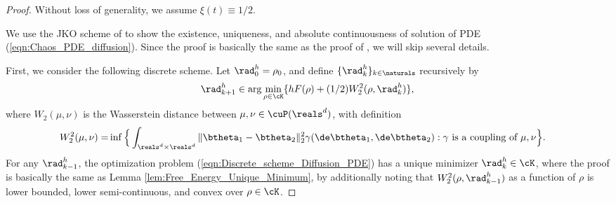 \documentclass[11pt]{article}
\begin{document}
\begin{proof} 
Without loss of generality, we assume $\xi(t) \equiv 1/2$. 
%
%


We use the JKO scheme of \cite[Theorem 5.1]{jordan1998variational} to show the existence, uniqueness, and absolute continuousness of solution of PDE (\ref{eqn:Chaos_PDE_diffusion}). Since the proof is basically the same as the proof of \cite[Theorem 5.1]{jordan1998variational}, we will skip several details.


First, we consider the following discrete scheme. Let $\rad_{0}^{h} = \rho_0$, and define $\{\rad_k^h\}_{k\in\naturals}$ recursively by
\begin{align}\label{eqn:Discrete_scheme_Diffusion_PDE}
\rad_{k+1}^h\in \arg\min_{\rho \in \cK} \{ h F(\rho) + (1/2)  W_2^2(\rho, \rad_{k}^{h}) \},
\end{align}
where $W_2(\mu, \nu)$ is the Wasserstein distance between $\mu, \nu \in \cuP(\reals^d)$, with definition
\[
\begin{aligned}
W_2^2(\mu, \nu) 
=& \inf \Big\{ \int_{\reals^d \times \reals^d} \| \btheta_1 - \btheta_2 \|_2^2 \gamma(\de \btheta_1, \de \btheta_2): \gamma \text{ is a coupling of } \mu, \nu \Big\}. 
\end{aligned}
\]
For any $\rad_{k-1}^{h}$, the optimization problem (\ref{eqn:Discrete_scheme_Diffusion_PDE}) has a unique minimizer $\rad_{k}^{h} \in \cK$, where the proof is basically the same as Lemma \ref{lem:Free_Energy_Unique_Minimum}, by additionally noting that $W_2^2(\rho, \rad_{k-1}^h)$ as a function of $\rho$ is lower bounded, lower semi-continuous, and convex over $\rho \in \cK$. 


\end{proof}
\end{document}
